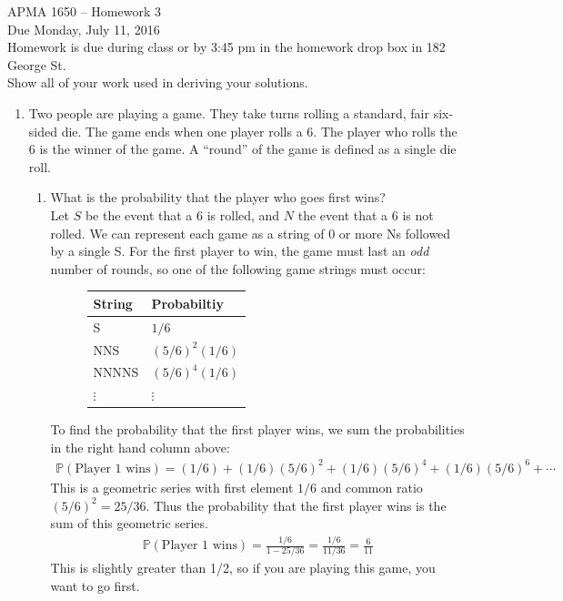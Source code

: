 \documentclass[12pt]{article}
\def\P{{\mathbb P}}
\begin{document}
\title{}
\author{\vspace{-10ex} }

\begin{center}
{\LARGE APMA 1650 -- Homework 3}\\
\vspace{5mm}
{\large Due Monday, July 11, 2016}\\
\vspace{5mm}
Homework is due during class or by 3:45 pm in the homework drop box in 182 George St.\\
Show all of your work used in deriving your solutions.
\end{center}

\begin{enumerate}

\item Two people are playing a game. They take turns rolling a standard, fair six-sided die. The game ends when one player rolls a 6. The player who rolls the 6 is the winner of the game. A ``round'' of the game is defined as a single die roll.
\begin{enumerate}
\item What is the probability that the player who goes first wins?\\

Let $S$ be the event that a 6 is rolled, and $N$ the event that a 6 is not rolled. We can represent each game as a string of 0 or more Ns followed by a single S. For the first player to win, the game must last an \emph{odd} number of rounds, so one of the following game strings must occur:
\begin{figure}[H]
\centering
\begin{tabular}{l@{\hskip 2cm}l}
\toprule
String & Probabiltiy\\
\midrule
S & $1/6$\\
NNS & $(5/6)^2 (1/6)$ \\
NNNNS & $(5/6)^4 (1/6)$\\
$\vdots$ & $\vdots$\\
\bottomrule
\end{tabular}
\end{figure}
To find the probability that the first player wins, we sum the probabilities in the right hand column above:
\begin{align*}
\P(\text{Player 1 wins}) = (1/6) + (1/6) (5/6)^2 + (1/6) (5/6)^4 +  (1/6) (5/6)^6 + \cdots
\end{align*}
This is a geometric series with first element $1/6$ and common ratio $(5/6)^2 = 25/36$. Thus the probability that the first player wins is the sum of this geometric series.
\begin{align*}
\P(\text{Player 1 wins}) = \frac{1/6}{1 - 25/36} = \frac{1/6}{11/36} = \frac{6}{11}
\end{align*}
This is slightly greater than 1/2, so if you are playing this game, you want to go first.


\end{enumerate}
\end{enumerate}
\end{document}
